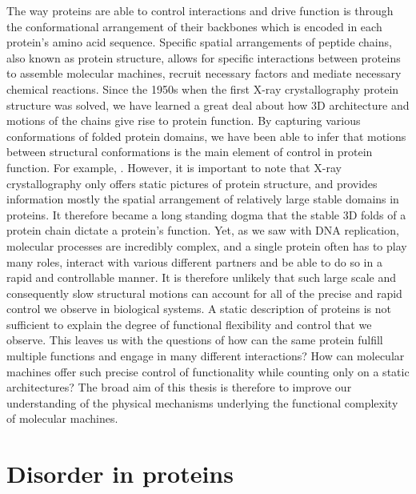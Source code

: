 The way proteins are able to control interactions and drive function is through the conformational arrangement of their backbones which is encoded in each protein's amino acid sequence. Specific spatial arrangements of peptide chains, also known as protein structure, allows for specific interactions between proteins to assemble molecular machines, recruit necessary factors and mediate necessary chemical reactions.  Since the 1950s when the first X-ray crystallography protein structure was solved, we have learned a great deal about how 3D architecture and motions of the chains give rise to protein function. By capturing various conformations of folded protein domains, we have been able to infer that motions between structural conformations is the main element of control in protein function. For example, .   However, it is important to note that X-ray crystallography only offers static pictures of protein structure, and provides information mostly the spatial arrangement of relatively large stable domains in proteins. It therefore became a long standing dogma that the stable 3D folds of a protein chain dictate a protein's function. Yet, as we saw with DNA replication, molecular processes are incredibly complex, and a single protein often has to play many roles, interact with various different partners and be able to do so in a rapid and controllable manner. It is therefore unlikely that such large scale and consequently slow structural motions can account for all of the precise and rapid control we observe in biological systems. A static description of proteins is not sufficient to explain the degree of functional flexibility and control that we observe. This leaves us with the questions of how can the same protein fulfill multiple functions and engage in many different interactions? How can molecular machines offer such precise control of functionality while counting only on a static architectures? The broad aim of this thesis is therefore to improve our understanding of the physical mechanisms underlying the functional complexity of molecular machines.



\section{Disorder in proteins}

